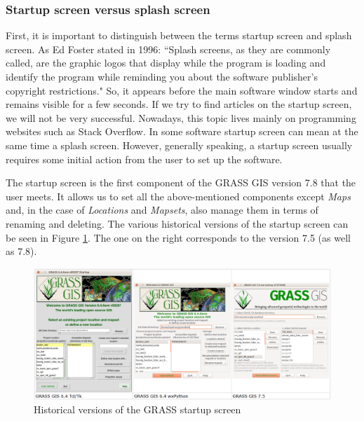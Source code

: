 \documentclass[a4paper,10pt,twoside]{article}
\begin{document}
\subsubsection{Startup screen versus splash screen}
\label{subsection:mechanism}
\noindent
\large
First, it is important to distinguish between the terms startup screen and splash screen. As Ed Foster stated in 1996: ``Splash screens, as they are commonly called, are the graphic logos that display while the program is loading and identify the program while reminding you about the software publisher's copyright restrictions." So, it appears before the main software window starts and remains visible for a few seconds. If we try to find articles on the startup screen, we will not be very successful. Nowadays, this topic lives mainly on programming websites such as Stack Overflow. In some software startup screen can mean at the same time a splash screen. However, generally speaking, a startup screen usually requires some initial action from the user to set up the software. 

The startup screen is the first component of the GRASS GIS version 7.8 that the user meets. It allows us to set all the above-mentioned components except \textit{Maps} and, in the case of \textit{Locations} and \textit{Mapsets}, also manage them in terms of renaming and deleting. The various historical versions of the startup screen can be seen in Figure \ref{fig:verze_startup}. The one on the right corresponds to the version 7.5 (as well as 7.8).

\vspace{0.3cm}
\begin{figure}[hbt!]
\begin{center}
\includegraphics[width=17cm]{../pictures/verze_startup.png} 
\caption[Historical versions of the GRASS startup screen]{Historical versions of the GRASS startup screen}
\label{fig:verze_startup}
\end{center}
\end{figure}
\end{document}
